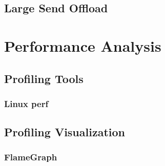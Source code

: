 \documentclass[bsc,frontabs,twoside,singlespacing,parskip,deptreport]{infthesis}     %
\begin{document}



\section{Large Send Offload}









\chapter{Performance Analysis}

\section{Profiling Tools}

\subsection{Linux perf}


\section{Profiling Visualization}
\subsection{FlameGraph}







\end{document}
